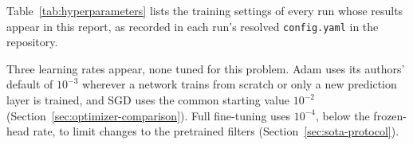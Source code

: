 
Table~\ref{tab:hyperparameters} lists the training settings of every run whose
results appear in this report, as recorded in each run's resolved
\texttt{config.yaml} in the repository.

Three learning rates appear, none tuned for this problem. Adam uses its
authors' default of $10^{-3}$ wherever a network trains from scratch or only a
new prediction layer is trained, and SGD uses the common starting value
$10^{-2}$ (Section~\ref{sec:optimizer-comparison}). Full fine-tuning uses
$10^{-4}$, below the frozen-head rate, to limit changes to the pretrained
filters (Section~\ref{sec:sota-protocol}).

